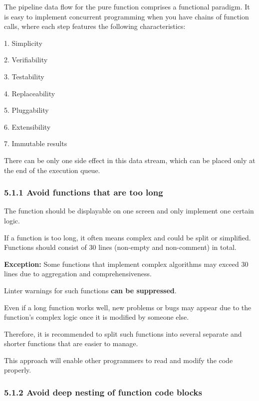 The pipeline data flow for the pure function comprises a functional paradigm. It is easy to implement concurrent programming when you have chains of function calls, where each step features the following characteristics:

1.	Simplicity

2.	Verifiability

3.	Testability

4.	Replaceability

5.	Pluggability

6.	Extensibility

7.	Immutable results



There can be only one side effect in this data stream, which can be placed only at the end of the execution queue.



\subsubsection*{\textbf{5.1.1 Avoid functions that are too long}}
\leavevmode\newline

\label{sec:5.1.1}



The function should be displayable on one screen and only implement one certain logic.

If a function is too long, it often means complex and could be split or simplified. Functions should consist of 30 lines (non-empty and non-comment) in total.



\textbf{Exception:} Some functions that implement complex algorithms may exceed 30 lines due to aggregation and comprehensiveness.

Linter warnings for such functions \textbf{can be suppressed}. 



Even if a long function works well, new problems or bugs may appear due to the function's complex logic once it is modified by someone else.

Therefore, it is recommended to split such functions into several separate and shorter functions that are easier to manage.

This approach will enable other programmers to read and modify the code properly.

\subsubsection*{\textbf{5.1.2 Avoid deep nesting of function code blocks}}
\leavevmode\newline


